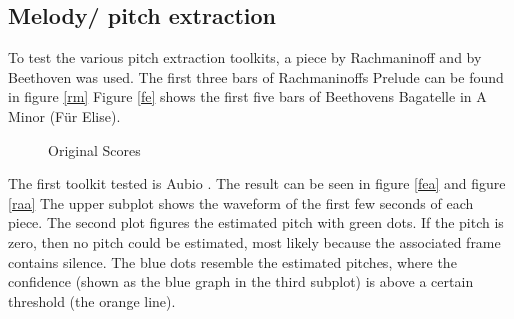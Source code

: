 \subsection{Melody/ pitch extraction}\label{midiest}
To test the various pitch extraction toolkits, a piece by Rachmaninoff and by Beethoven was used. The first three bars of Rachmaninoffs Prelude can be found in figure \ref{rm}
Figure \ref{fe} shows the first five bars of Beethovens Bagatelle in A Minor (Für Elise).


\begin{figure}[htbp]
	\centering
	\caption{Original Scores}
	\label{fig:sheets}
\end{figure}

The first toolkit tested is Aubio \cite{aubio1}. The result can be seen in figure \ref{fea} and figure \ref{raa}
The upper subplot shows the waveform of the first few seconds of each piece. The second plot figures the estimated pitch with green dots. If the pitch is zero, then no pitch could be estimated, most likely because the associated frame contains silence. The blue dots resemble the estimated pitches, where the confidence (shown as the blue graph in the third subplot) is above a certain threshold (the orange line).

